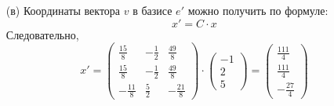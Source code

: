 \documentclass[a4paper]{article}
\newcommand{\mat}[1]{\begin{pmatrix} #1 \end{pmatrix}}
\begin{document}
\begin{enumerate}
\begin{enumerate}
        \item[(в)]Координаты вектора $v$ в базисе $e'$ можно получить по формуле:
        $$x' = C\cdot x$$
        Следовательно,
        $$x' = \mat{\frac{15}{8} & -\frac{1}{2} & \frac{49}{8}\\
        \frac{15}{8} & -\frac{1}{2} & \frac{49}{8} \\
        -\frac{11}{8} & \frac{5}{2} & -\frac{21}{8}} \cdot \mat{-1 \\2 \\ 5}=\begin{pmatrix}
            \frac{111}{4} \\
            \frac{111}{4} \\
            -\frac{27}{4}
            \end{pmatrix}$$\\
    \end{enumerate}


\end{enumerate}
\end{document}
